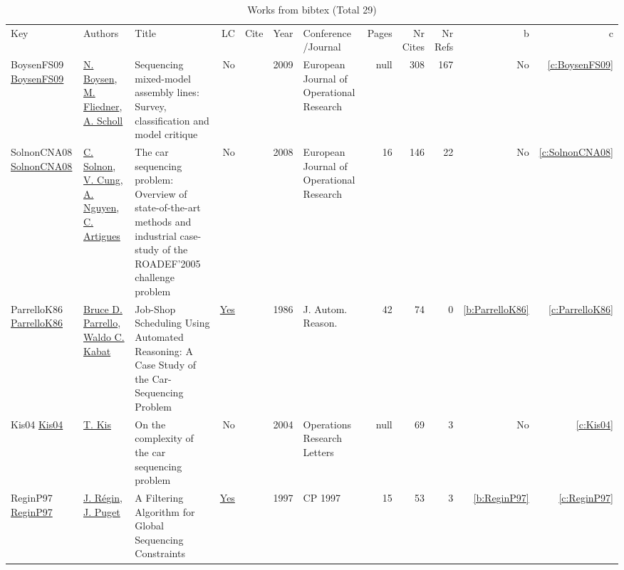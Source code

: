 {\scriptsize
\begin{longtable}{>{\raggedright\arraybackslash}p{3cm}>{\raggedright\arraybackslash}p{6cm}>{\raggedright\arraybackslash}p{6.5cm}rrrp{2.5cm}rrrrr}
\rowcolor{white}\caption{Works from bibtex (Total 29)}\\ \toprule
\rowcolor{white}Key & Authors & Title & LC & Cite & Year & \shortstack{Conference\\/Journal} & Pages & \shortstack{Nr\\Cites} & \shortstack{Nr\\Refs} & b & c \\ \midrule\endhead
\bottomrule
\endfoot
BoysenFS09 \href{http://dx.doi.org/10.1016/j.ejor.2007.09.013}{BoysenFS09} & \hyperref[auth:a48]{N. Boysen}, \hyperref[auth:a49]{M. Fliedner}, \hyperref[auth:a50]{A. Scholl} & Sequencing mixed-model assembly lines: Survey,  classification and model critique & No & \cite{BoysenFS09} & 2009 & European Journal of Operational Research & null & 308 & 167 & No & \ref{c:BoysenFS09}\\
SolnonCNA08 \href{https://doi.org/10.1016/j.ejor.2007.04.033}{SolnonCNA08} & \hyperref[auth:a5]{C. Solnon}, \hyperref[auth:a6]{V. Cung}, \hyperref[auth:a7]{A. Nguyen}, \hyperref[auth:a8]{C. Artigues} & The car sequencing problem: Overview of state-of-the-art methods and industrial case-study of the ROADEF'2005 challenge problem & No & \cite{SolnonCNA08} & 2008 & European Journal of Operational Research & 16 & 146 & 22 & No & \ref{c:SolnonCNA08}\\
ParrelloK86 \href{https://doi.org/10.1007/BF00246021}{ParrelloK86} & \hyperref[auth:a0]{Bruce D. Parrello}, \hyperref[auth:a1]{Waldo C. Kabat} & Job-Shop Scheduling Using Automated Reasoning: {A} Case Study of the Car-Sequencing Problem & \href{cars/works/ParrelloK86.pdf}{Yes} & \cite{ParrelloK86} & 1986 & J. Autom. Reason. & 42 & 74 & 0 & \ref{b:ParrelloK86} & \ref{c:ParrelloK86}\\
Kis04 \href{http://dx.doi.org/10.1016/j.orl.2003.09.003}{Kis04} & \hyperref[auth:a47]{T. Kis} & On the complexity of the car sequencing problem & No & \cite{Kis04} & 2004 & Operations Research Letters & null & 69 & 3 & No & \ref{c:Kis04}\\
ReginP97 \href{https://doi.org/10.1007/BFb0017428}{ReginP97} & \hyperref[auth:a33]{J. R{\'{e}}gin}, \hyperref[auth:a34]{J. Puget} & A Filtering Algorithm for Global Sequencing Constraints & \href{cars/works/ReginP97.pdf}{Yes} & \cite{ReginP97} & 1997 & CP 1997 & 15 & 53 & 3 & \ref{b:ReginP97} & \ref{c:ReginP97}\\

\end{longtable}}
